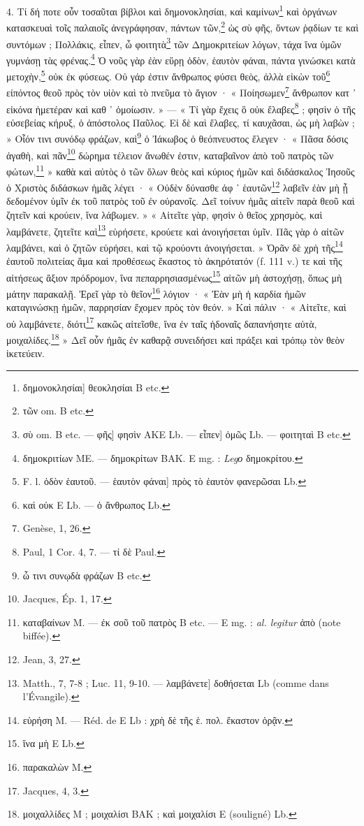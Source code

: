 \documentclass[a4paper, 11pt, oneside, polutonikogreek, french]{article}
\begin{document}
4. Τί δή ποτε οὖν τοσαῦται βίβλοι καὶ δημονοκλησίαι, καὶ καμίνων\footnote{δημονοκλησίαι] θεοκλησίαι B etc.} καὶ ὀργάνων κατασκευαὶ τοῖς παλαιοῖς ἀνεγράφησαν, πάντων τῶν,\footnote{τῶν om. B etc.} ὡς σὺ φῆς, ὄντων ῥᾳδίων τε καὶ συντόμων ; Πολλάκις, εἶπεν, ὦ φοιτητὰ\footnote{σὺ om. B etc. --- φῆς] φησὶν AKE Lb. --- εἶπεν] ὁμῶς Lb. --- φοιτηταὶ B etc.} τῶν Δημοκριτείων λόγων, τάχα ἵνα ὑμῶν γυμνάσῃ τὰς φρένας.\footnote{δημοκριτίων ME. --- δημοκρίτων BAK. E mg. : \emph{Legο} δημοκρίτου.} Ὁ νοῦς γὰρ ἐὰν εὕρῃ ὁδὸν, ἑαυτὸν φάναι, πάντα γινώσκει κατὰ μετοχὴν,\footnote{F. l. ὁδὸν ἑαυτοῦ. --- ἑαυτὸν φάναι] πρὸς τὸ ἑαυτὸν φανερῶσαι Lb.} οὐκ ἐκ φύσεως. Οὐ γάρ ἐστιν ἄνθρωπος φύσει θεὸς, ἀλλὰ εἰκὼν τοῦ\footnote{καὶ οὐκ E Lb. --- ὁ ἄνθρωπος Lb.} εἰπόντος θεοῦ πρὸς τὸν υἱὸν καὶ τὸ πνεῦμα τὸ ἅγιον · « Ποίησωμεν\footnote{Genèse, 1, 26.} ἄνθρωπον κατ ᾽ εἰκόνα ἡμετέραν καὶ καθ ᾽ ὁμοίωσιν. » --- « Τί γὰρ ἔχεις ὃ οὐκ ἔλαβες\footnote{Paul, 1 Cor. 4, 7. --- τί δὲ Paul.} ; φησὶν ὁ τῆς εὐσεβείας κήρυξ, ὁ ἀπόστολος Παῦλος. Εἰ δὲ καὶ ἔλαβες, τί καυχᾶσαι, ὡς μὴ λαβὼν ; » Οἷόν τινι συνόδῳ φράζων, καὶ\footnote{ὧ τινι συνῳδὰ φράζων B etc.} ὁ Ἰάκωβος ὁ θεόπνευστος ἔλεγεν · « Πᾶσα δόσις ἀγαθὴ, καὶ πᾶν\footnote{Jacques, Ép. 1, 17.} δώρημα τέλειον ἄνωθέν ἐστιν, καταβαῖνον ἀπὸ τοῦ πατρὸς τῶν φώτων,\footnote{καταβαίνων M. --- ἐκ σοῦ τοῦ πατρὸς B etc. --- E mg. : \emph{al. legitur} ἀπὸ (note biffée).} » καθὰ καὶ αὐτὸς ὁ τῶν ὅλων θεὸς καὶ κύριος ἡμῶν καὶ διδάσκαλος Ἰησοῦς ὁ Χριστὸς διδάσκων ἡμᾶς λέγει · « Οὐδὲν δύνασθε ἀφ ᾽ ἑαυτῶν\footnote{Jean, 3, 27.} λαβεῖν ἐὰν μὴ ᾖ δεδομένον ὑμῖν ἐκ τοῦ πατρὸς τοῦ ἐν οὐρανοῖς. Δεῖ τοίνυν ἡμᾶς αἰτεῖν παρὰ θεοῦ καὶ ζητεῖν καὶ κρούειν, ἵνα λάβωμεν. » « Αἰτεῖτε γὰρ, φησὶν ὁ θεῖος χρησμὸς, καὶ λαμβάνετε, ζητεῖτε καὶ\footnote{Matth., 7, 7-8 ; Luc. 11, 9-10. --- λαμβάνετε] δοθήσεται Lb (comme dans l'Évangile).} εὑρήσετε, κρούετε καὶ ἀνοιγήσεται ὑμῖν. Πᾶς γὰρ ὁ αἰτῶν λαμβάνει, καὶ ὁ ζητῶν εὑρήσει, καὶ τῷ κρούοντι ἀνοιγήσεται. » Ὁρᾶν δὲ χρὴ τῆς\footnote{εὑρήση M. --- Réd. de E Lb : χρὴ δὲ τῆς ἑ. πολ. ἕκαστον ὁρᾷν.} ἐαυτοῦ πολιτείας ἅμα καὶ προθέσεως ἕκαστος τὸ ἀκηρότατόν (f. 111 v.) τε καὶ τῆς αἰτήσεως ἄξιον πρόδρομον, ἵνα πεπαρρησιασμένως\footnote{ἵνα μὴ E Lb.} αἰτῶν μὴ ἀστοχήσῃ, ὅπως μὴ μάτην παρακαλῇ. Ἐρεῖ γὰρ τὸ θεῖον\footnote{παρακαλὼν M.} λόγιον · « Ἐὰν μὴ ἡ καρδία ἡμῶν καταγινώσκῃ ἡμῶν, παρρησίαν ἔχομεν πρὸς τὸν θεόν. » Καὶ πάλιν · « Αἰτεῖτε, καὶ οὐ λαμβάνετε, διότι\footnote{Jacques, 4, 3.} κακῶς αἰτεῖσθε, ἵνα ἐν ταῖς ἡδοναῖς δαπανήσητε αὐτὰ, μοιχαλίδες.\footnote{μοιχαλλίδες M ; μοιχαλίσι BAΚ ; καὶ μοιχαλίσι E (souligné) Lb.} » Δεῖ οὖν ἡμᾶς ἐν καθαρᾷ συνειδήσει καὶ πράξει καὶ τρόπῳ τὸν θεὸν ἱκετεύειν.
\end{document}
